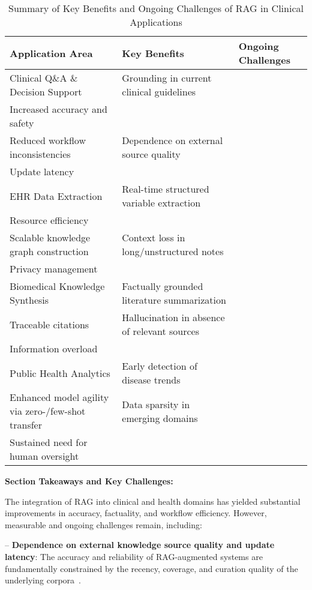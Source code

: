 \documentclass[sigconf]{acmart}
\begin{document}
\begin{table*}[htbp]
\centering
\caption{Summary of Key Benefits and Ongoing Challenges of RAG in Clinical Applications}
\label{tab:clinical_rag_summary}
\begin{adjustbox}{max width=\textwidth}
\begin{tabular}{lll}
\toprule
\textbf{Application Area} & \textbf{Key Benefits} & \textbf{Ongoing Challenges} \\
\midrule
Clinical Q\&A \& Decision Support & 
Grounding in current clinical guidelines\\
Increased accuracy and safety\\
Reduced workflow inconsistencies
& 
Dependence on external source quality\\
Update latency
\\
EHR Data Extraction & 
Real-time structured variable extraction\\
Resource efficiency\\
Scalable knowledge graph construction
& 
Context loss in long/unstructured notes\\
Privacy management
\\
Biomedical Knowledge Synthesis & 
Factually grounded literature summarization\\
Traceable citations
& 
Hallucination in absence of relevant sources\\
Information overload
\\
Public Health Analytics & 
Early detection of disease trends\\
Enhanced model agility via zero-/few-shot transfer
& 
Data sparsity in emerging domains\\
Sustained need for human oversight
\\
\bottomrule
\end{tabular}
\end{adjustbox}
\end{table*}

\noindent\textbf{Section Takeaways and Key Challenges:}
\vspace{0.5em}

The integration of RAG into clinical and health domains has yielded substantial improvements in accuracy, factuality, and workflow efficiency. However, measurable and ongoing challenges remain, including:
 
-- \textbf{Dependence on external knowledge source quality and update latency}: The accuracy and reliability of RAG-augmented systems are fundamentally constrained by the recency, coverage, and curation quality of the underlying corpora~\cite{ref49, ref54, ref55, ref61}.
\end{document}
